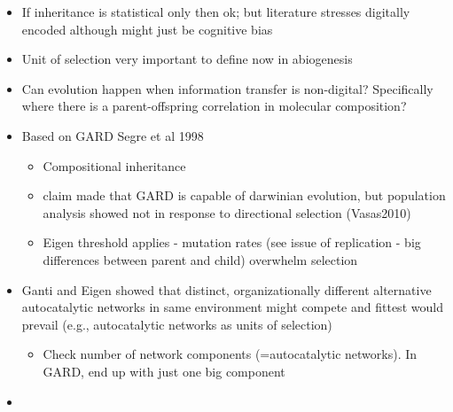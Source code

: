 		\begin{itemize}
			
			\item
			If inheritance is statistical only then ok; but literature
			stresses digitally encoded although might just be cognitive bias
			
			\item
			
			Unit of selection very important to define now in abiogenesis
			
			\item
			
			Can evolution happen when information transfer is non-digital?
			Specifically where there is a parent-offspring correlation in
			molecular composition?
			
			\item
			
			Based on GARD Segre et al 1998
			
			
			\begin{itemize}
				\item
				
				Compositional inheritance
				
				\item
				
				claim made that GARD is capable of darwinian evolution, but
				population analysis showed not in response to directional selection
				(Vasas2010)
				
				\item
				
				Eigen threshold applies - mutation rates (see issue of replication -
				big differences between parent and child) overwhelm selection
				
			\end{itemize}
			\item
			
			Ganti and Eigen showed that distinct, organizationally different
			alternative autocatalytic networks in same environment might compete
			and fittest would prevail (e.g., autocatalytic networks as units of
			selection)
			
			
			\begin{itemize}
				\item
				
				Check number of network components (=autocatalytic networks). In
				GARD, end up with just one big component
				
			\end{itemize}
			\item
			

\end{itemize}
